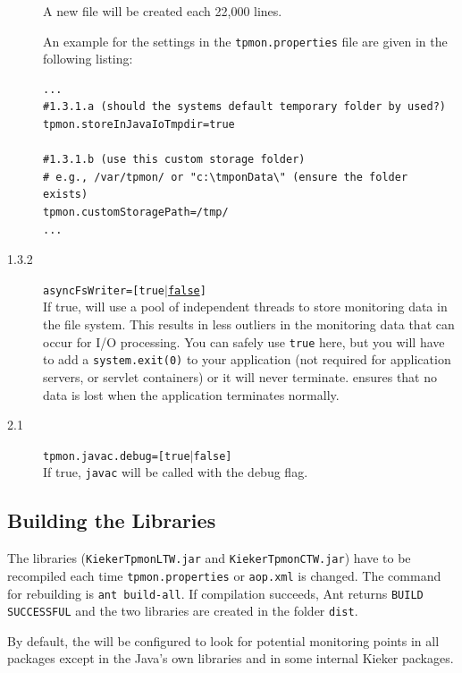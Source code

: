 \documentclass[a4paper,12pt]{scrartcl}
\begin{document}
\begin{description}
A new file will be created each 22,000 lines.

An example for the settings in the \texttt{tpmon.properties} file are given in the following listing:
\begin{lstlisting}[caption={Linux/Unix: Specification of the monitoring data storage location}]
...
#1.3.1.a (should the systems default temporary folder by used?)
tpmon.storeInJavaIoTmpdir=true

#1.3.1.b (use this custom storage folder)
# e.g., /var/tpmon/ or "c:\tmponData\" (ensure the folder exists)
tpmon.customStoragePath=/tmp/
...
\end{lstlisting}

\item [1.3.2] \texttt{asyncFsWriter=[true$|$\underline{false}]} \\
If true, \tpmon{} will use a pool of independent threads to store monitoring data in the file system. This results in less outliers in the monitoring data that can occur for I/O processing. You can safely use \texttt{true} here, but you will have to add a \texttt{system.exit(0)} to your application (not required for application servers, or servlet containers) or it will never terminate. \tpmon{} ensures that no data is lost when the application terminates normally.
\item [2.1] \texttt{tpmon.javac.debug=[true$|$\texttt{false}]} \\
If true, \texttt{javac} will be called with the debug flag.
\end{description}

\subsection{Building the \tpmon{} Libraries}
The \tpmon{} libraries (\texttt{KiekerTpmonLTW.jar} and \texttt{KiekerTpmonCTW.jar}) have to be recompiled each time \texttt{tpmon.properties} or \texttt{aop.xml} is changed. The command for rebuilding \tpmon{} is \texttt{ant build-all}. If compilation succeeds, Ant returns \texttt{BUILD SUCCESSFUL} and the two libraries are created in the folder \texttt{dist}.


By default, the \tpmonltw{} will be configured to look for potential monitoring points in all packages except in the Java's own libraries and in some internal Kieker packages. %
\end{document}
